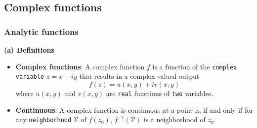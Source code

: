 \subsection{Complex functions}

\subsubsection{Analytic functions}
\textbf{(a) Definitions}

\begin{itemize}
	\item \textbf{Complex functions}: A complex function $f$ is a function of the \verb|complex variable| $z=x+iy$ that results in a complex-valued output
	$$
	f(z) = u(x,y) + iv(x,y)
	$$
	where $u(x,y)$ and $v(x,y) $ are \verb|real| functions of \verb|two| variables.
	\item \textbf{Continuous}: A complex function is continuous at a point $z_0$ if and only if for any \verb|neighborhood| $\mathcal{V}$ of $f(z_0)$, $f^{-1}(\mathcal{V})$ is a neighborhood of $z_0$. 
\end{itemize}